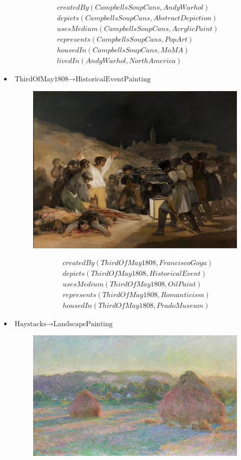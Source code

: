 \documentclass{article}
\begin{document}
\begin{itemize}
\begin{align*}
      &createdBy(CampbellsSoupCans, AndyWarhol)\\
      &depicts(CampbellsSoupCans, AbstractDepiction)\\
      &usesMedium(CampbellsSoupCans, AcrylicPaint)\\
      &represents(CampbellsSoupCans, PopArt)\\
      &housedIn(CampbellsSoupCans, MoMA)\\
      &livedIn(AndyWarhol, NorthAmerica)
    \end{align*}
  \item $\text{ThirdOfMay1808} \to \text{HistoricalEventPainting}$
    \begin{figure}[H]
      \centering
      \includegraphics[width=\linewidth]{images/thirdofmay.jpg}
    \end{figure}
    \begin{align*}
      &createdBy(ThirdOfMay1808, FranciscoGoya)\\
      &depicts(ThirdOfMay1808, HistoricalEvent)\\
      &usesMedium(ThirdOfMay1808, OilPaint)\\
      &represents(ThirdOfMay1808, Romanticism)\\
      &housedIn(ThirdOfMay1808, PradoMuseum)
    \end{align*}
  \item $\text{Haystacks} \to \text{LandscapePainting}$
    \begin{figure}[H]
      \centering
      \includegraphics[width=\linewidth]{images/haystacks.jpg}

\end{figure}
\end{itemize}
\end{document}
